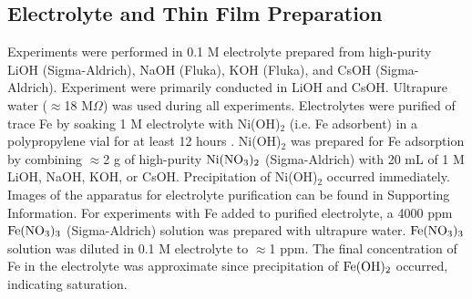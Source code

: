 \documentclass[journal=jpccck,manuscript=article,email=true]{achemso}
\begin{document}
\subsection{Electrolyte and Thin Film Preparation}
\label{sec-2-1}
Experiments were performed in 0.1 M electrolyte prepared from high-purity LiOH (Sigma-Aldrich), NaOH (Fluka), KOH (Fluka), and CsOH (Sigma-Aldrich). Experiment were primarily conducted in LiOH and CsOH. Ultrapure water ($\approx$18 M$\Omega$) was used during all experiments. Electrolytes were purified of trace Fe by soaking 1 M electrolyte with Ni(OH)$_{\text{2}}$ (i.e. Fe adsorbent) in a polypropylene vial for at least 12 hours \cite{trotochaud-2014-nickel-iron}. Ni(OH)$_{\text{2}}$ was prepared for Fe adsorption by combining $\approx$2 g of high-purity \(\ce{Ni(NO3)2}\) (Sigma-Aldrich) with 20 mL of 1 M LiOH, NaOH, KOH, or CsOH. Precipitation of  Ni(OH)$_{\text{2}}$ occurred immediately. Images of the apparatus for electrolyte purification can be found in Supporting Information. For experiments with Fe added to purified electrolyte, a 4000 ppm \(\ce{Fe(NO3)3}\) (Sigma-Aldrich) solution was prepared with ultrapure water. \(\ce{Fe(NO3)3}\) solution was diluted in 0.1 M electrolyte to $\approx$1 ppm. The final concentration of Fe in the electrolyte was approximate since precipitation of \(\ce{Fe(OH)2}\) occurred, indicating saturation.
\end{document}
